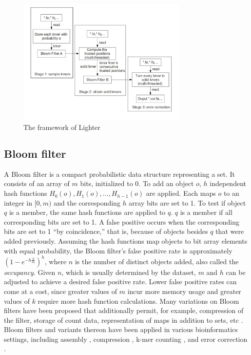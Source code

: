\documentclass[10pt]{article}
\begin{document}
\begin{figure}[h!]
\begin{center}
\includegraphics[width=0.75\textwidth]{lighter_framework.png}
\caption{The framework of Lighter\label{fig:lighter_framework}}
\end{center}
\end{figure}

\subsection*{Bloom filter}
A Bloom filter \cite{bloom1970space} is a compact probabilistic data structure representing a set.  It consists of an array of $m$ bits, initialized to 0.  To add an object $o$, $h$ independent hash functions $H_0(o), H_1(o),...,H_{h-1}(o)$ are applied.  Each maps $o$ to an integer in $[0, m)$ and the corresponding $h$ array bits are set to 1. To test if object $q$ is a member, the same hash functions are applied to $q$.  $q$ is a member if all corresponding bits are set to 1.  A false positive occurs when the corresponding bits are set to 1 ``by coincidence,'' that is, because of objects besides $q$ that were added previously.  Assuming the hash functions map objects to bit array elements with equal probability, the Bloom filter's false positive rate is approximately $(1-e^{-h\frac{n}{m}})^h$, where $n$ is the number of distinct objects added, also called the \emph{occupancy}.  Given $n$, which is usually determined by the dataset, $m$ and $h$ can be adjusted to achieve a desired false positive rate.  Lower false positive rates can come at a cost, since greater values of $m$ incur more memory usage and greater values of $k$ require more hash function calculations.  Many variations on Bloom filters have been proposed that additionally permit, for example, compression of the filter, storage of count data, representation of maps in addition to sets, etc \cite{tarkoma2012theory}.  Bloom filters and variants thereon have been applied in various bioinformatics settings, including assembly \cite{pell2012scaling}, compression \cite{jones2012compression}, k-mer counting \cite{melsted2011efficient}, and error correction \cite{shi2010parallel}.
\end{document}
